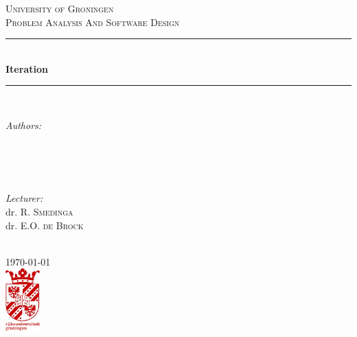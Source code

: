 \documentclass[11pt]{article}
\begin{document}
\begin{titlepage}

\newcommand{\HRule}{\rule{\linewidth}{0.5mm}} %

\center %
 

\textsc{\LARGE University of Groningen}\\[1.5cm] %
\textsc{\Large Problem Analysis And Software Design}\\[0.5cm] %

\HRule \\[0.4cm]
{ \huge \bfseries Iteration \iterno}\\[0.4cm] %
\HRule \\[1.5cm]

\begin{minipage}{0.5\textwidth}
\begin{flushleft} \large
\emph{Authors:}\\
\studentA \\
\studentB \\
\studentC
\end{flushleft}
\end{minipage}
~
\begin{minipage}{0.4\textwidth}
\begin{flushright} \large
\emph{Lecturer:} \\
dr. R. \textsc{Smedinga} \\
dr. E.O. \textsc{de Brock}

\end{flushright}
\end{minipage}\\[2cm]

{\large \today}\\[2cm] %

\includegraphics[width=50px, keepaspectratio]{logo_rug.jpg}\\[1cm] %

\vfill %

\end{titlepage}
\end{document}
